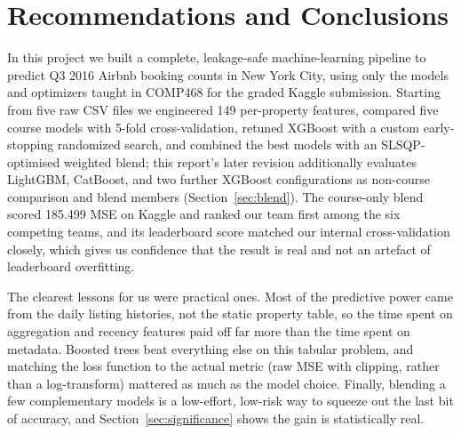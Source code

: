 \documentclass[journal]{IEEEtran}
\begin{document}
\section{Recommendations and Conclusions}
\label{sec:concl}
In this project we built a complete, leakage-safe machine-learning pipeline to
predict Q3 2016 Airbnb booking counts in New York City, using only the models and
optimizers taught in COMP468 for the graded Kaggle submission. Starting from
five raw CSV files we engineered 149 per-property features, compared five
course models with 5-fold cross-validation, retuned XGBoost with a custom
early-stopping randomized search, and combined the best models with an
SLSQP-optimised weighted blend; this report's later revision additionally
evaluates LightGBM, CatBoost, and two further XGBoost configurations as
non-course comparison and blend members (Section~\ref{sec:blend}). The
course-only blend scored 185.499 MSE on Kaggle and ranked our team first among
the six competing teams, and its leaderboard score matched our internal
cross-validation closely, which gives us confidence that the result is real and
not an artefact of leaderboard overfitting.

The clearest lessons for us were practical ones. Most of the predictive power
came from the daily listing histories, not the static property table, so the time
spent on aggregation and recency features paid off far more than the time spent
on metadata. Boosted trees beat everything else on this tabular problem, and
matching the loss function to the actual metric (raw MSE with clipping, rather
than a log-transform) mattered as much as the model choice. Finally, blending a
few complementary models is a low-effort, low-risk way to squeeze out the last
bit of accuracy, and Section~\ref{sec:significance} shows the gain is
statistically real.
\end{document}
